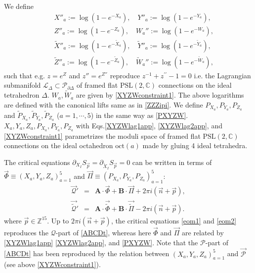 \documentclass[aps,prd,notitlepage,nofootinbib,superscriptaddress,groupedaddress,twocolumn]{revtex4-1}
\newcommand{\PSlc}{\mathrm{PSL}(2,\mathbb{C})}
\def\be{\begin{eqnarray}}
\def\ee{\end{eqnarray}}
\newcommand{\cl}{\mathcal L}
\newcommand{\calp}{\mathcal P}
\newcommand{\scrp}{\mathscr{P}}
\newcommand{\scrq}{\mathscr{Q}}
\newcommand{\lt}{\left}
\newcommand{\rt}{\right}
\begin{document}
We define
\be
&&X''_a:=\log\lt(1-e^{-X_a}\rt),\quad Y''_a:=\log\lt(1-e^{-Y_a}\rt),\nonumber\\
&&Z''_a:=\log\lt(1-e^{-Z_a}\rt),\quad W_a'':=\log\lt(1-e^{-W_a}\rt),\label{XYZWlag1app}\\
&&\widetilde{X}''_a:=\log\lt(1-e^{-\widetilde{X}_a}\rt),\quad \widetilde{Y}''_a:=\log\lt(1-e^{-\widetilde{Y}_a}\rt),\nonumber\\
&&\widetilde{Z}''_a:=\log\lt(1-e^{-\widetilde{Z}_a}\rt),\quad \widetilde{W}_a'':=\log\lt(1-e^{-\widetilde{W}_a}\rt), \label{XYZWlag2app}
\ee 
such that e.g. $z=e^Z$ and $z''=e^{Z''}$ reproduce $z^{-1}+z^{\prime \prime}-1=0$ i.e. the Lagrangian submanifold $\cl_\Delta\subset \calp_{\partial\Delta}$ of framed flat $\PSlc$ connections on the ideal tetrahedron $\Delta$. $W_a,\widetilde{W}_a$ are given by \eqref{XYZWconstraint1}. The above logarithms are defined with the canonical lifts same as in \eqref{ZZZipi}. We define $P_{X_{a}},P_{Y_a},P_{Z_{a}}$ and $\widetilde{P}_{X_{a}},\widetilde{P}_{Y_{a}},\widetilde{P}_{Z_a}$ ($a=1,\cdots,5$) in the same way as \eqref{PXYZW}.
$X_a,Y_a,Z_a,P_{X_a},P_{Y_a},P_{Z_a}$ with Eqs.\eqref{XYZWlag1app}, \eqref{XYZWlag2app}, and \eqref{XYZWconstraint1} parametrizes the moduli space of framed flat $\PSlc$ connections on the ideal octahedron $\mathrm{oct}(a)$ made by gluing 4 ideal tetrahedra.

The critical equations $\partial_{X_I} S_{\vec{p}}=\partial_{\widetilde{X}_I} S_{\vec{p}}=0$ can be written in terms of $\vec{\Phi} \equiv\left(X_{a}, Y_{a}, Z_{a}\right)_{a=1}^{5}$ and $ \vec{\Pi} \equiv\left(P_{X_{a}}, P_{Y_{a}}, P_{Z_{a}}\right)_{a=1}^{5}$:
\be
\vec{\scrq}'&=&\mathbf{A}\cdot \vec{\Phi} +\mathbf{B}\cdot \vec{\Pi} %
+2\pi i(\vec{n}+\vec{p}),\label{eom1app}\\
\vec{\widetilde{\scrq}}'&=&\mathbf{A } \cdot \vec{\widetilde \Phi}+\mathbf{B}\cdot \vec{\widetilde \Pi}%
-2\pi i(\vec{n}+\vec{p}).\label{eom2app}
\ee
where $\vec{p}\in\mathbb{Z}^{15}$. Up to $2\pi i(\vec{n}+\vec{p})$, the critical equations \eqref{eom1} and \eqref{eom2} reproduces the $\scrq$-part of \eqref{ABCDt}, whereas here $\vec{\Phi}$ and $\vec{\Pi}$ are related by \eqref{XYZWlag1app} \eqref{XYZWlag2app}, and \eqref{PXYZW}. Note that the $\scrp$-part of \eqref{ABCDt} has been reproduced by the relation between $\left(X_{a}, Y_{a}, Z_{a}\right)_{a=1}^{5}$ and $\vec{\scrp}$ (see above \eqref{XYZWconstraint1}). 
\end{document}
